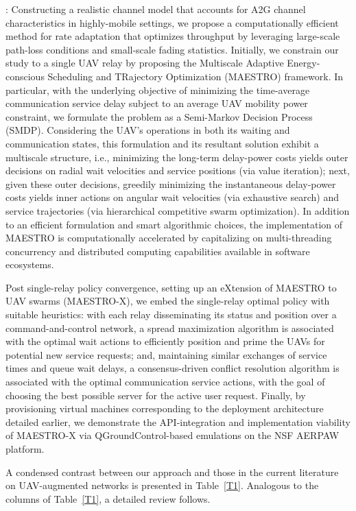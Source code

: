 \documentclass[12pt, draftcls, onecolumn]{IEEEtran}
\theoremstyle{plain}
\theoremstyle{definition}
\theoremstyle{remark}
\begin{document}
: Constructing a realistic channel model that accounts for A2G channel characteristics in highly-mobile settings, we propose a computationally efficient method for rate adaptation that optimizes throughput by leveraging large-scale path-loss conditions and small-scale fading statistics. Initially, we constrain our study to a single UAV relay by proposing the Multiscale Adaptive Energy-conscious Scheduling and TRajectory Optimization (MAESTRO) framework. In particular, with the underlying objective of minimizing the time-average communication service delay subject to an average UAV mobility power constraint, we formulate the problem as a Semi-Markov Decision Process (SMDP). Considering the UAV's operations in both its waiting and communication states, this formulation and its resultant solution exhibit a multiscale structure, i.e., minimizing the long-term delay-power costs yields outer decisions on radial wait velocities and service positions (via value iteration); next, given these outer decisions, greedily minimizing the instantaneous delay-power costs yields inner actions on angular wait velocities (via exhaustive search) and service trajectories (via hierarchical competitive swarm optimization). In addition to an efficient formulation and smart algorithmic choices, the implementation of MAESTRO is computationally accelerated by capitalizing on multi-threading concurrency and distributed computing capabilities available in software ecosystems. 

Post single-relay policy convergence, setting up an eXtension of MAESTRO to UAV swarms (MAESTRO-X), we embed the single-relay optimal policy with suitable heuristics: with each relay disseminating its status and position over a command-and-control network, a spread maximization algorithm is associated with the optimal wait actions to efficiently position and prime the UAVs for potential new service requests; and, maintaining similar exchanges of service times and queue wait delays, a consensus-driven conflict resolution algorithm is associated with the optimal communication service actions, with the goal of choosing the best possible server for the active user request. Finally, by provisioning virtual machines corresponding to the deployment architecture detailed earlier, we demonstrate the API-integration and implementation viability of MAESTRO-X via QGroundControl-based emulations on the NSF AERPAW platform.

A condensed contrast between our approach and those in the current literature on UAV-augmented networks is presented in Table~\ref{T1}. Analogous to the columns of Table~\ref{T1}, a detailed review follows.
\end{document}

